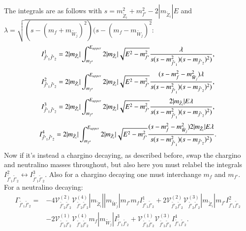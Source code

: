 \documentclass[final,3p,times,pdflatex]{elsarticle}
\begin{document}
The integrals are as follows with $s = m_{\tilde{Z}_i}^2 + m_{f'}^2 - 2|m_{\tilde{Z}_i}|E$ and $\lambda = \sqrt{(s-(m_{f}+m_{\tilde{W}_j})^2)(s-(m_{f}-m_{\tilde{W}_j})^2}$:
\begin{equation}
I_{\tilde{f'}_1 \tilde{f'}_2}^{1} = 2|m_{\tilde{Z}_i}| \int_{m_{f'}}^{E_{upper}} 2|m_{\tilde{Z}_i}|\sqrt{E^2-m_{f'}^2} {\lambda \over s(s-m_{\tilde{f'}_1}^2)(s-m_{\tilde{f'}_2})^2)},
\end{equation}
\begin{equation}
I_{\tilde{f'}_1 \tilde{f'}_2}^{2} = 2|m_{\tilde{Z}_i}| \int_{m_{f'}}^{E_{upper}} 2|m_{\tilde{Z}_i}|\sqrt{E^2-m_{f'}^2} {(s-m_{f}^2-m_{\tilde{W}_j}^2)\lambda \over s(s-m_{\tilde{f'}_1}^2)(s-m_{\tilde{f'}_2})^2)},
\end{equation}
\begin{equation}
I_{\tilde{f'}_1 \tilde{f'}_2}^{3} = 2|m_{\tilde{Z}_i}| \int_{m_{f'}}^{E_{upper}} 2|m_{\tilde{Z}_i}|\sqrt{E^2-m_{f'}^2} {2|m_{\tilde{Z}_i}|E \lambda \over s(s-m_{\tilde{f'}_1}^2)(s-m_{\tilde{f'}_2})^2)},
\end{equation}
\begin{equation}
I_{\tilde{f'}_1 \tilde{f'}_2}^{4} = 2|m_{\tilde{Z}_i}| \int_{m_{f'}}^{E_{upper}} 2|m_{\tilde{Z}_i}|\sqrt{E^2-m_{f'}^2}{(s-m_{f}^2-m_{\tilde{W}_j}^2)2|m_{\tilde{Z}_i}|E \lambda \over s(s-m_{\tilde{f'}_1}^2)(s-m_{\tilde{f'}_2})^2)}.
\end{equation}
Now if it's instead a chargino decaying, as described before, swap the chargino and neutralino masses throughout, but also here you must relabel the integrals $I_{\tilde{f'}_1 \tilde{f'}_2}^{2} \leftrightarrow I_{\tilde{f'}_1 \tilde{f'}_2}^{3}$. Also for a chargino decaying one must interchange $m_f$ and $m_{f'}$. For a neutralino decaying:
\begin{equation}
\begin{aligned}
\Gamma_{\tilde{f'}_1 \tilde{f'}_2} = & -4 \mathcal{V}_{\tilde{f'}_2 \tilde{f'}_2}^{(2)} \mathcal{V}_{\tilde{f'}_2 \tilde{f'}_2}^{(4)} |m_{\tilde{Z}_i}||m_{\tilde{W}_j}|m_{f'}m_{f} I_{\tilde{f'}_1 \tilde{f'}_2}^{1} + 2 \mathcal{V}_{\tilde{f'}_2 \tilde{f'}_2}^{(2)} \mathcal{V}_{\tilde{f'}_2 \tilde{f'}_2}^{(3)}|m_{\tilde{Z}_i}|m_{f'} I_{\tilde{f'}_1 \tilde{f'}_2}^{2} \\ & - 2 \mathcal{V}_{\tilde{f'}_2 \tilde{f'}_2}^{(1)} \mathcal{V}_{\tilde{f'}_2 \tilde{f'}_2}^{(4)} m_{f}|m_{\tilde{W}_j}| I_{\tilde{f'}_1 \tilde{f'}_2}^{3} + \mathcal{V}_{\tilde{f'}_2 \tilde{f'}_2}^{(1)} \mathcal{V}_{\tilde{f'}_2 \tilde{f'}_2}^{(3)} I_{\tilde{f'}_1 \tilde{f'}_2}^{4}.
\end{aligned}
\end{equation}
\end{document}
